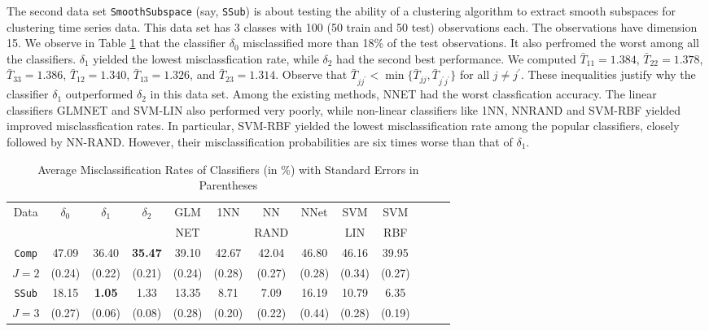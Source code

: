\documentclass[twoside]{article}
\newcommand{\bF}{\mathbf{F}}
\newcommand{\0}{\mathbf{0}}
\newcommand{\1}{\mathbf{1}}
\numberwithin{equation}{section}
\begin{document}
\noindent The second data set {\tt SmoothSubspace} (say, {\tt SSub}) is about testing the ability of a clustering algorithm to extract smooth subspaces for clustering time series data. This data set has 3 classes with 100 (50 train and 50 test) observations each. The observations have dimension 15. We observe in Table \ref{realtab} that the classifier $\delta_0$ misclassified more than 18\% of the test observations. It also perfromed the worst among all the classifiers. $\delta_1$ yielded the lowest misclassfication rate, while $\delta_2$ had the second best performance. We computed $\bar{T}_{11}=1.384$, $\bar{T}_{22}=1.378$, $\bar{T}_{33}=1.386$, $\bar{T}_{12}=1.340$, $\bar{T}_{13}=1.326$, and $\bar{T}_{23}=1.314$. Observe that $\bar{T}_{jj^\prime}<\min\{\bar{T}_{jj},\bar{T}_{j^\prime j^\prime}\}$ for all $ j\neq j^\prime $. These inequalities justify why the classifier $\delta_1$ outperformed $\delta_2$ in this data set.
Among the existing methods, NNET had the worst classfication accuracy. The linear classifiers GLMNET and SVM-LIN also performed very poorly, while non-linear classifiers like 1NN, NNRAND and SVM-RBF yielded improved misclassfication rates. In particular, SVM-RBF yielded the lowest misclassification rate among the popular classifiers, closely followed by NN-RAND. However, their misclassification probabilities are six times worse than that of $\delta_1$.
\begin{table}[h]%
\scriptsize
\caption{\small Average Misclassification Rates of Classifiers (in \%)  with Standard Errors in Parentheses}
\label{realtab}
\setlength{\tabcolsep}{1pt} %
\vspace{3pt}
\begin{tabular}{ccccccccccccc}
\hline
Data  & $\delta_0$ & $\delta_1$ & $\delta_2$ & GLM & 1NN   & NN    & NNet  & SVM & SVM \\
&&&&NET&&RAND&&LIN&RBF\\ \hline %
{\tt Comp}   & 47.09      & 36.40           & {\bf 35.47}           & 39.10  & 42.67 & 42.04 & 46.80 & 46.16  & 39.95  \\
            $J=2$ & (0.24)       & (0.22)            & (0.21)  & (0.24)   & (0.28)  & (0.27)  & (0.28)  & (0.34)   & (0.27)   \\ %
{\tt SSub} &  18.15      & {\bf 1.05}            & 1.33            & 13.35  & 8.71  & 7.09  & 16.19 & 10.79  & 6.35   \\
          $J=3$ & (0.27)       & (0.06)            & (0.08)            & (0.28)   & (0.20)  & (0.22)  & (0.44)  & (0.28)   & (0.19)   \\ \hline %
\end{tabular}
\vspace{-0.1in}
\end{table}%
\end{document}
